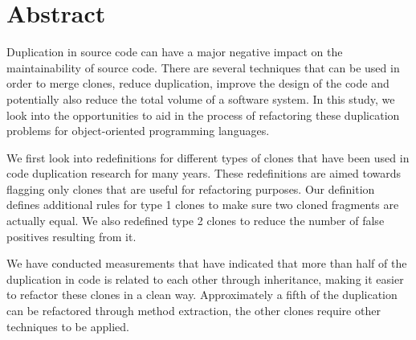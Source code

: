\chapter*{Abstract}

Duplication in source code can have a major negative impact on the maintainability of source code. There are several techniques that can be used in order to merge clones, reduce duplication, improve the design of the code and potentially also reduce the total volume of a software system. In this study, we look into the opportunities to aid in the process of refactoring these duplication problems for object-oriented programming languages.

We first look into redefinitions for different types of clones that have been used in code duplication research for many years. These redefinitions are aimed towards flagging only clones that are useful for refactoring purposes. Our definition defines additional rules for type 1 clones to make sure two cloned fragments are actually equal. We also redefined type 2 clones to reduce the number of false positives resulting from it.

We have conducted measurements that have indicated that more than half of the duplication in code is related to each other through inheritance, making it easier to refactor these clones in a clean way. Approximately a fifth of the duplication can be refactored through method extraction, the other clones require other techniques to be applied.

